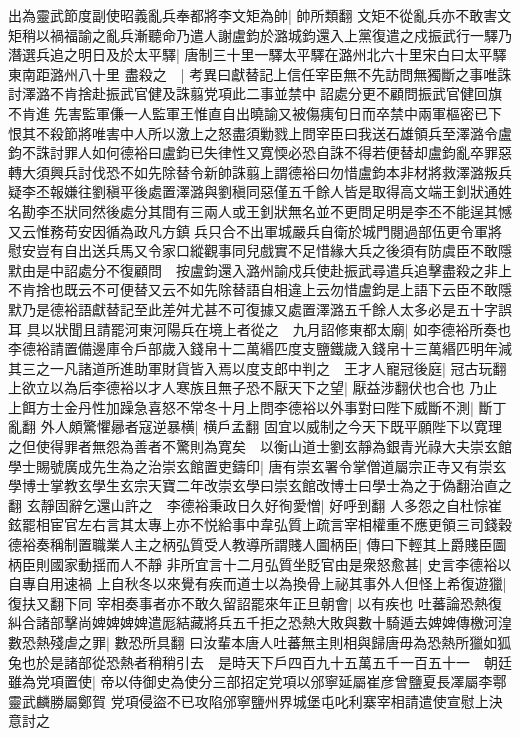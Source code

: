 出為靈武節度副使昭義亂兵奉都將李文矩為帥|{
	帥所類翻}
文矩不從亂兵亦不敢害文矩稍以禍福諭之亂兵漸聽命乃遣人謝盧鈞於潞城鈞還入上黨復遣之戍振武行一驛乃潛選兵追之明日及於太平驛|{
	唐制三十里一驛太平驛在潞州北六十里宋白曰太平驛東南距潞州八十里}
盡殺之　|{
	考異曰獻替記上信任宰臣無不先訪問無獨斷之事唯誅討澤潞不肯捨赴振武官健及誅翦党項此二事並禁中詔處分更不顧問振武官健回旗不肯進先害監軍傔一人監軍王惟直自出曉諭又被傷痍旬日而卒禁中兩軍樞密已下恨其不殺節將唯害中人所以激上之怒盡須勦戮上問宰臣曰我送石雄領兵至澤潞令盧鈞不誅討罪人如何德裕曰盧鈞已失律性又寛愞必恐自誅不得若便替却盧鈞亂卒罪惡轉大須興兵討伐恐不如先除替令新帥誅翦上謂德裕曰勿惜盧鈞本非材將救澤潞叛兵疑李丕報嫌往劉稹平後處置澤潞與劉稹同惡僅五千餘人皆是取得高文端王釗狀通姓名勘李丕狀同然後處分其間有三兩人或王釗狀無名並不更問足明是李丕不能逞其憾又云惟務苟安因循為政凡方鎮兵只合不出軍城嚴兵自衛於城門閱過部伍更令軍將慰安豈有自出送兵馬又令家口縱觀事同兒戲實不足惜緣大兵之後須有防虞臣不敢隱默由是中詔處分不復顧問　按盧鈞還入潞州諭戍兵使赴振武尋遣兵追擊盡殺之非上不肯捨也既云不可便替又云不如先除替語自相違上云勿惜盧鈞是上語下云臣不敢隱默乃是德裕語獻替記至此差舛尤甚不可復據又處置澤潞五千餘人太多必是五十字誤耳}
具以狀聞且請罷河東河陽兵在境上者從之　九月詔修東都太廟|{
	如李德裕所奏也}
李德裕請置備邊庫令戶部歲入錢帛十二萬緡匹度支鹽鐵歲入錢帛十三萬緡匹明年減其三之一凡諸道所進助軍財貨皆入焉以度支郎中判之　王才人寵冠後庭|{
	冠古玩翻}
上欲立以為后李德裕以才人寒族且無子恐不厭天下之望|{
	厭益涉翻伏也合也}
乃止　上餌方士金丹性加躁急喜怒不常冬十月上問李德裕以外事對曰陛下威斷不測|{
	斷丁亂翻}
外人頗驚懼曏者寇逆暴横|{
	横戶孟翻}
固宜以威制之今天下既平願陛下以寛理之但使得罪者無怨為善者不驚則為寛矣　以衡山道士劉玄靜為銀青光祿大夫崇玄館學士賜號廣成先生為之治崇玄館置吏鑄印|{
	唐有崇玄署令掌僧道屬宗正寺又有崇玄學博士掌教玄學生玄宗天寶二年改崇玄學曰崇玄館改博士曰學士為之于偽翻治直之翻}
玄靜固辭乞還山許之　李德裕秉政日久好徇愛憎|{
	好呼到翻}
人多怨之自杜悰崔鉉罷相宦官左右言其太專上亦不悦給事中韋弘質上疏言宰相權重不應更領三司錢穀德裕奏稱制置職業人主之柄弘質受人教導所謂賤人圖柄臣|{
	傳曰下輕其上爵賤臣圖柄臣則國家動揺而人不靜}
非所宜言十二月弘質坐貶官由是衆怒愈甚|{
	史言李德裕以自專自用速禍}
上自秋冬以來覺有疾而道士以為換骨上祕其事外人但怪上希復遊獵|{
	復扶又翻下同}
宰相奏事者亦不敢久留詔罷來年正旦朝會|{
	以有疾也}
吐蕃論恐熱復糾合諸部擊尚婢婢婢婢遣厖結藏將兵五千拒之恐熱大敗與數十騎遁去婢婢傳檄河湟數恐熱殘虐之罪|{
	數恐所具翻}
曰汝輩本唐人吐蕃無主則相與歸唐毋為恐熱所獵如狐兔也於是諸部從恐熱者稍稍引去　是時天下戶四百九十五萬五千一百五十一　朝廷雖為党項置使|{
	帝以侍御史為使分三部招定党項以邠寧延屬崔彦曾鹽夏長凙屬李鄠靈武麟勝屬鄭賀}
党項侵盜不已攻陷邠寧鹽州界城堡屯叱利寨宰相請遣使宣慰上決意討之

